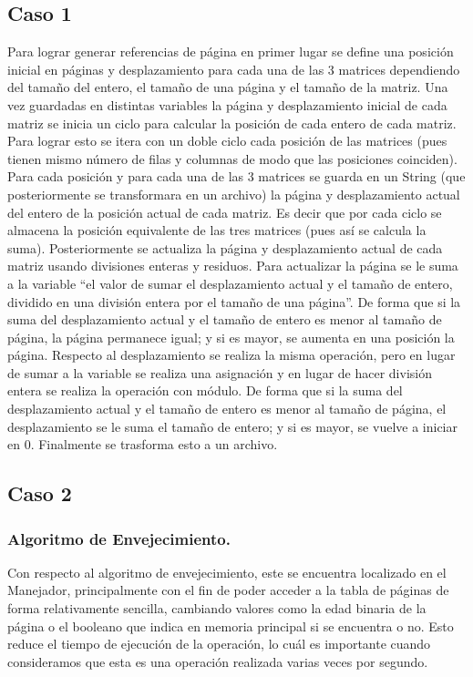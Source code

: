\documentclass[a4paper]{article}
\begin{document}
\subsection{Caso 1}
Para lograr generar referencias de página en primer lugar se define una
posición inicial en páginas y desplazamiento para cada una de las 3 
matrices dependiendo del tamaño del entero, el tamaño de una página y 
el tamaño de la matriz. Una vez guardadas en distintas variables la 
página y desplazamiento inicial de cada matriz se inicia un ciclo para 
calcular la posición de cada entero de cada matriz. Para lograr esto 
se itera con un doble ciclo cada posición de las matrices (pues 
tienen mismo número de filas y columnas de modo que las posiciones 
coinciden). Para cada posición y para cada una de las 3 matrices se 
guarda en un String (que posteriormente se transformara en un archivo) 
la página y desplazamiento actual del entero de la posición actual de 
cada matriz. Es decir que por cada ciclo se almacena la posición 
equivalente de las tres matrices (pues así se calcula la suma). 
Posteriormente se actualiza la página y desplazamiento actual de cada 
matriz usando divisiones enteras y residuos. Para actualizar la página 
se le suma a la variable “el valor de sumar el desplazamiento actual y 
el tamaño de entero, dividido en una división entera por el tamaño de 
una página”. De forma que si la suma del desplazamiento actual y el 
tamaño de entero es menor al tamaño de página, la página permanece 
igual; y si es mayor, se aumenta en una posición la página. Respecto al 
desplazamiento se realiza la misma operación, pero en lugar de sumar a 
la variable se realiza una asignación y en lugar de hacer división 
entera se realiza la operación con módulo. De forma que si la suma del 
desplazamiento actual y el tamaño de entero es menor al tamaño de 
página, el desplazamiento se le suma el tamaño de entero; y si es 
mayor, se vuelve a iniciar en 0. Finalmente se trasforma esto a un 
archivo.

\subsection{Caso 2}
\subsubsection{Algoritmo de Envejecimiento.}
Con respecto al algoritmo de envejecimiento, este se encuentra localizado
en el Manejador, principalmente con el fin de poder acceder a la tabla de 
páginas de forma relativamente sencilla, cambiando valores como la edad binaria
de la página o el booleano que indica en memoria principal si se encuentra
o no. Esto reduce el tiempo de ejecución de la operación, lo cuál es importante
cuando consideramos que esta es una operación realizada varias veces por segundo.
\end{document}
